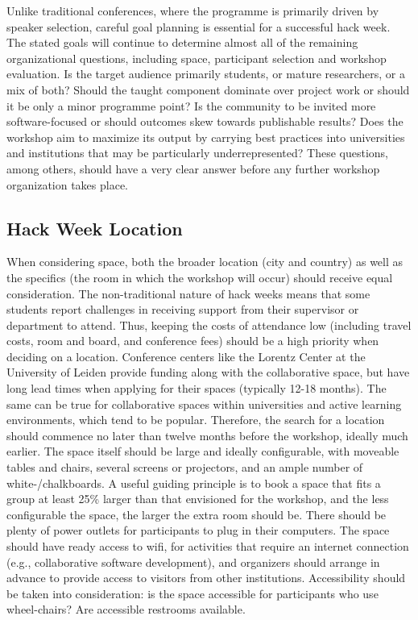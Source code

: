 \documentclass{nature}
\begin{document}
Unlike traditional conferences, where the programme is primarily driven by speaker selection, careful goal planning is essential for a successful hack week. The stated goals will continue to determine almost all of the remaining organizational questions, including space, participant selection and workshop evaluation. Is the target audience primarily students, or mature researchers, or a mix of both? Should the taught component dominate over project work or should it be only a minor programme point? Is the community to be invited more software-focused or should outcomes skew towards publishable results? Does the workshop aim to maximize its output by carrying best practices into universities and institutions that may be particularly underrepresented? These questions, among others, should have a very clear answer before any further workshop organization takes place.

\subsection{Hack Week Location}
When considering space, both the broader location (city and country) as well as the specifics (the room in which the workshop will occur) should receive equal consideration. The non-traditional nature of hack weeks means that some students report challenges in receiving support from their supervisor or department to attend. Thus, keeping the costs of attendance low (including travel costs, room and board, and conference fees) should be a high priority when deciding on a location. Conference centers like the Lorentz Center at the University of Leiden provide funding along with the collaborative space, but have long lead times when applying for their spaces (typically 12-18 months). The same can be true for collaborative spaces within universities and active learning environments, which tend to be popular. Therefore, the search for a location should commence no later than twelve months before the workshop, ideally much earlier.
The space itself should be large and ideally configurable, with moveable tables and chairs, several screens or projectors, and an ample number of white-/chalkboards. A useful guiding principle is to book a space that fits a group at least 25\% larger than that envisioned for the workshop, and the less configurable the space, the larger the extra room should be.
There should be plenty of power outlets for participants to plug in their computers.
The space should have ready access to wifi, for activities that require an internet connection (e.g., collaborative software development), and organizers should arrange in advance to provide access to visitors from other institutions.
Accessibility should be taken into consideration: is the space accessible for participants who use wheel-chairs? Are accessible restrooms available.
\end{document}

